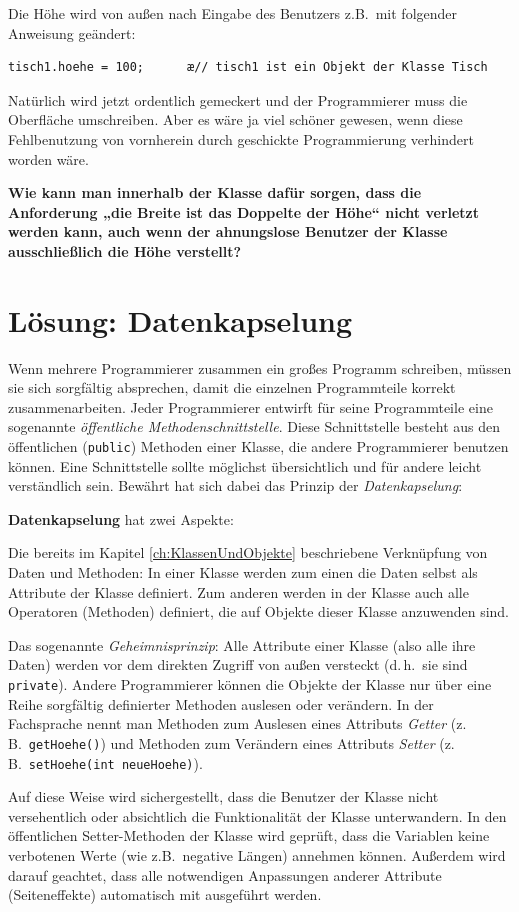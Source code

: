 Die Höhe wird von außen nach Eingabe des Benutzers z.B.\ mit folgender Anweisung
geändert:

\begin{lstlisting}
tisch1.hoehe = 100;      æ// tisch1 ist ein Objekt der Klasse Tisch
\end{lstlisting}

Natürlich wird jetzt ordentlich gemeckert und der Programmierer muss die
Oberfläche umschreiben. Aber es wäre ja viel schöner gewesen, wenn diese
Fehlbenutzung von vornherein durch geschickte Programmierung verhindert worden
wäre.

\textbf{Wie kann man innerhalb der Klasse  dafür sorgen, dass
die Anforderung „die Breite ist das Doppelte der Höhe“ nicht verletzt werden kann,
auch wenn der ahnungslose Benutzer der Klasse ausschließlich die Höhe
verstellt?}


\section{Lösung: Datenkapselung}

Wenn mehrere Programmierer zusammen ein großes Programm schreiben,
müssen sie sich sorgfältig absprechen, damit die einzelnen Programmteile
korrekt zusammenarbeiten. Jeder Programmierer entwirft für seine
Programmteile eine sogenannte \emph{öffentliche Methodenschnittstelle}. Diese Schnittstelle besteht
aus den öffentlichen (\lstinline|public|) Methoden einer Klasse,
die andere Programmierer benutzen können. Eine Schnittstelle sollte möglichst
übersichtlich und für andere leicht verständlich sein. Bewährt hat sich dabei
das Prinzip der \emph{Datenkapselung}:

\textbf{Datenkapselung} hat zwei Aspekte:

\begin{compactenum}
\item Die bereits im Kapitel \ref{ch:KlassenUndObjekte} beschriebene
Verknüpfung von Daten und Methoden: In einer Klasse werden zum einen die Daten
selbst als Attribute der Klasse definiert. Zum anderen werden in der Klasse auch
alle Operatoren (Methoden) definiert, die auf Objekte dieser Klasse anzuwenden
sind.
\item Das sogenannte \emph{Geheimnisprinzip}: Alle Attribute einer Klasse
(also alle ihre Daten) werden vor dem direkten Zugriff von außen versteckt (d.\,h.\ sie
sind \lstinline|private|). Andere Programmierer können die Objekte der Klasse
nur über eine Reihe sorgfältig definierter Methoden auslesen oder verändern. 
In der Fachsprache nennt man Methoden zum Auslesen eines Attributs \emph{Getter} 
(z.\,B.\ \lstinline|getHoehe()|) und Methoden zum Verändern eines Attributs \emph{Setter} 
(z.\,B.\ \lstinline|setHoehe(int neueHoehe)|).

Auf diese Weise wird sichergestellt, dass die Benutzer der Klasse nicht versehentlich oder
absichtlich die Funktionalität der Klasse unterwandern. In den öffentlichen
Setter-Methoden der Klasse wird geprüft, dass die Variablen keine verbotenen
Werte (wie z.B.\ negative Längen) annehmen können. Außerdem wird darauf geachtet, dass 
alle notwendigen Anpassungen anderer Attribute (Seiteneffekte) automatisch mit ausgeführt werden.
\end{compactenum}

